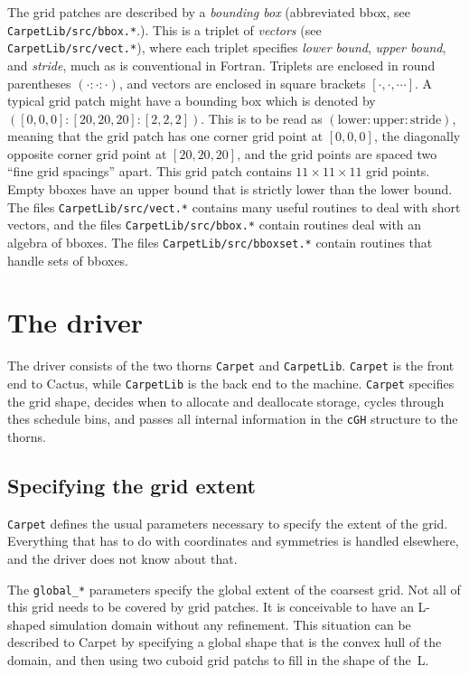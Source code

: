 \documentclass{article}
\begin{document}
   The grid patches are described by a \emph{bounding box}
   (abbreviated bbox, see \texttt{CarpetLib/src/bbox.*}.).  This is a
   triplet of \emph{vectors} (see \texttt{CarpetLib/src/vect.*}),
   where each triplet specifies \emph{lower bound}, \emph{upper
   bound}, and \emph{stride}, much as is conventional in Fortran.
   Triplets are enclosed in round parentheses $(\cdot:\cdot:\cdot)$,
   and vectors are enclosed in square brackets $[\cdot,\cdot,\cdots]$.
   A typical grid patch might have a bounding box which is denoted by
   $([0,0,0]:[20,20,20]:[2,2,2])$.  This is to be read as
   $(\textrm{lower}:\textrm{upper}:\textrm{stride})$, meaning that the
   grid patch has one corner grid point at $[0,0,0]$, the diagonally
   opposite corner grid point at $[20,20,20]$, and the grid points are
   spaced two ``fine grid spacings'' apart.  This grid patch contains
   $11 \times 11 \times 11$ grid points.  Empty bboxes have an upper
   bound that is strictly lower than the lower bound.  The files
   \texttt{CarpetLib/src/vect.*} contains many useful routines to deal
   with short vectors, and the files \texttt{CarpetLib/src/bbox.*}
   contain routines deal with an algebra of bboxes.  The files
   \texttt{CarpetLib/src/bboxset.*} contain routines that handle sets
   of bboxes.



\section{The driver}

   The driver consists of the two thorns \texttt{Carpet} and
   \texttt{CarpetLib}.  \texttt{Carpet} is the front end to
   Cactus, while \texttt{CarpetLib} is the back end to the
   machine.  \texttt{Carpet} specifies the grid shape, decides when to
   allocate and deallocate storage, cycles through thes schedule bins,
   and passes all internal information in the \texttt{cGH} structure
   to the thorns.



\subsection{Specifying the grid extent}

   \texttt{Carpet} defines the usual parameters necessary to specify
   the extent of the grid.  Everything that has to do with coordinates
   and symmetries is handled elsewhere, and the driver does not know
   about that.

   The \texttt{global\_*} parameters specify the global extent of the
   coarsest grid.  Not all of this grid needs to be covered by grid
   patches.  It is conceivable to have an L-shaped simulation domain
   without any refinement.  This situation can be described to Carpet
   by specifying a global shape that is the convex hull of the domain,
   and then using two cuboid grid patchs to fill in the shape of
   the~L.
\end{document}
